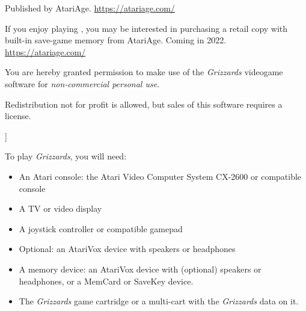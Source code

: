 \documentclass[10pt,twocolumn,openany,article]{memoir}
\begin{document}
Published by AtariAge. \href{https://atariage.com/}{https://atariage.com/}

\ifdefined\ATARIAGESAVE\else  If you  enjoy playing  ,
you  may  be  interested  in  purchasing a  retail  copy  with  built-in
save-game    memory    from    AtariAge.    Coming    in    2022.  
\href{https://atariage.com/}{https://atariage.com/}

\bigskip

You are hereby granted permission  to make use of the \textit{Grizzards}
videogame software for \emph{non-commercial personal use}.

Redistribution not for profit is allowed, but sales of this software
requires a license.

\fi

]

\let\cleardoublepage\clearpage

\mainmatter

\tableofcontents


To play \textit{Grizzards}, you will need:

\vspace{12pt}

\begin{itemize}
\item  An Atari  console: the  Atari  Video Computer  System CX-2600  or
  compatible console
\item A TV or video display
\item A joystick controller or compatible gamepad
  \ifdefined\ATARIAGESAVE
  \item Optional: an AtariVox device with speakers or headphones
  \else
  \ifdefined\NOSAVE\else
\item A  memory device: an  AtariVox device with (optional)  speakers or
  headphones, or a MemCard or SaveKey device.
  \fi\fi
\item The \textit{Grizzards} game cartridge \ifdefined\ATARIAGESAVE\else
  or a multi-cart with the \textit{Grizzards} data on it. \fi
\end{itemize}
\end{document}

